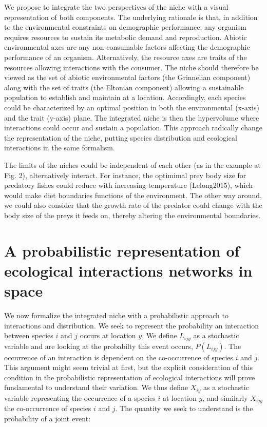 \documentclass[12pt]{article}
\begin{document}
We propose to integrate the two perspectives of the niche with a visual
representation of both components. The underlying rationale is that, in
addition to the environmental constraints on demographic performance, any
organism requires resources to sustain its metabolic demand and reproduction.
Abiotic environmental axes are any non-consumable factors affecting the
demographic performance of an organism. Alternatively, the resource axes are
traits of the resources allowing interactions with the consumer. The niche
should therefore be viewed as the set of abiotic environmental factors (the
Grinnelian component) along with the set of traits (the Eltonian component)
allowing a sustainable population to establish and maintain at a location.
Accordingly, each species could be characterized by an optimal position in
both the environmental (x-axis) and the trait (y-axis) plane. The integrated
niche is then the hypervolume where interactions could occur and sustain a
population. This approach radically change the representation of the niche,
putting species distribution and ecological interactions in the same
formalism.

The limits of the niches could be independent of each other (as in the example
at Fig. 2), alternatively interact. For instance, the optimimal prey body size
for predatory fishes could reduce with increasing temperature (Lelong2015),
which would make diet boundaries functions of the environment. The other way
around, we could also consider that the growth rate of the predator could
change with the body size of the preys it feeds on, thereby altering the
environmental boundaries.

\newpage
\section*{A probabilistic representation of ecological interactions networks in space}

We now formalize the integrated niche with a probabilistic approach to
interactions and distribution. We seek to represent the probability an
interaction between species $i$ and $j$ occurs at location $y$. We
define $L_{ijy}$ as a stochastic variable and are looking
at the probabilty this event occurs, $P(L_{ijy})$. The occurrence of an
interaction is dependent on the co-occurrence of species $i$ and $j$. This
argument might seem trivial at first, but the explicit consideration of this
condition in the probabilistic representation of ecological interactions will
prove fundamental to understand their variation. We thus define $X_{iy}$ as a
stochastic variable representing the occurrence of a species $i$ at location
$y$, and similarly $X_{ijy}$ the co-occurrence of species $i$ and $j$. The
quantity we seek to understand is the probability of a joint event:
\end{document}
